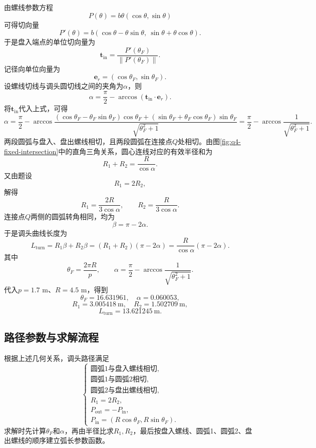 由螺线参数方程
\[
P(\theta)=b\theta(\cos\theta,\sin\theta)
\]
可得切向量
\[
P'(\theta)=b(\cos\theta-\theta\sin\theta,\ \sin\theta+\theta\cos\theta).
\]
于是盘入端点的单位切向量为
\[
\bm t_{\mathrm{in}}=
\frac{P'(\theta_F)}{\|P'(\theta_F)\|}.
\]
记径向单位向量为
\[
\bm e_r=(\cos\theta_F,\sin\theta_F).
\]
设螺线切线与调头圆切线之间的夹角为$\alpha$，则
\[
\alpha=\frac{\pi}{2}-\arccos(\bm t_{\mathrm{in}}\cdot\bm e_r).
\]
将$\bm t_{\mathrm{in}}$代入上式，可得
\[
\alpha
=\frac{\pi}{2}
-\arccos
\frac{(\cos\theta_F-\theta_F\sin\theta_F)\cos\theta_F
+(\sin\theta_F+\theta_F\cos\theta_F)\sin\theta_F}
{\sqrt{\theta_F^2+1}}
=\frac{\pi}{2}-\arccos\frac{1}{\sqrt{\theta_F^2+1}}.
\]
两段圆弧与盘入、盘出螺线相切，且两段圆弧在连接点$Q$处相切。由图\ref{fig:q4-fixed-intersection}中的直角三角关系，圆心连线对应的有效半径和为
\[
R_1+R_2=\frac{R}{\cos\alpha}.
\]
又由题设
\[
R_1=2R_2,
\]
解得
\[
R_1=\frac{2R}{3\cos\alpha},\qquad
R_2=\frac{R}{3\cos\alpha}.
\]
连接点$Q$两侧的圆弧转角相同，均为
\[
\beta=\pi-2\alpha.
\]
于是调头曲线长度为
\[
L_{\mathrm{turn}}
=R_1\beta+R_2\beta
=(R_1+R_2)(\pi-2\alpha)
=\frac{R}{\cos\alpha}(\pi-2\alpha).
\]
其中
\[
\theta_F=\frac{2\pi R}{p},\qquad
\alpha=\frac{\pi}{2}-\arccos\frac{1}{\sqrt{\theta_F^2+1}}.
\]
代入$p=1.7$ m、$R=4.5$ m，得到
\[
\theta_F=16.631961,\quad
\alpha=0.060053,
\]
\[
R_1=3.005418\ \text{m},\quad
R_2=1.502709\ \text{m},
\]
\[
L_{\mathrm{turn}}=13.621245\ \text{m}.
\]

\subsection{路径参数与求解流程}
根据上述几何关系，调头路径满足
\[
\begin{cases}
\text{圆弧1与盘入螺线相切},\\
\text{圆弧1与圆弧2相切},\\
\text{圆弧2与盘出螺线相切},\\
R_1=2R_2,\\
P_{\mathrm{out}}=-P_{\mathrm{in}},\\
P_{\mathrm{in}}=(R\cos\theta_F,R\sin\theta_F).
\end{cases}
\]
求解时先计算$\theta_F$和$\alpha$，再由半径比求$R_1,R_2$，最后按盘入螺线、圆弧1、圆弧2、盘出螺线的顺序建立弧长参数函数。

